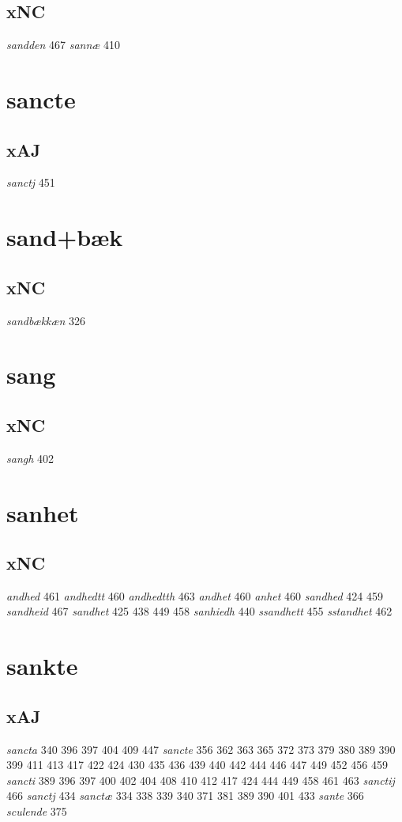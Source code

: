 \documentclass[a4paper,twocolumn]{article}
\begin{document}
\subsection{xNC}
\label{sec:org21b67e3}
\emph{sandden} 467 \emph{sannæ} 410 
\section{sancte}
\label{sec:org790601a}
\subsection{xAJ}
\label{sec:org2f84264}
\emph{sanctj} 451 
\section{sand+bæk}
\label{sec:org9165339}
\subsection{xNC}
\label{sec:orgfcf79a4}
\emph{sandbækkæn} 326 
\section{sang}
\label{sec:org15e0db7}
\subsection{xNC}
\label{sec:org1b73987}
\emph{sangh} 402 
\section{sanhet}
\label{sec:org9b6e014}
\subsection{xNC}
\label{sec:org605058f}
\emph{andhed} 461 \emph{andhedtt} 460 \emph{andhedtth} 463 \emph{andhet} 460 \emph{anhet} 460 \emph{sandhed} 424 459 \emph{sandheid} 467 \emph{sandhet} 425 438 449 458 \emph{sanhiedh} 440 \emph{ssandhett} 455 \emph{sstandhet} 462 
\section{sankte}
\label{sec:org24dffc0}
\subsection{xAJ}
\label{sec:org4a2619e}
\emph{sancta} 340 396 397 404 409 447 \emph{sancte} 356 362 363 365 372 373 379 380 389 390 399 411 413 417 422 424 430 435 436 439 440 442 444 446 447 449 452 456 459 \emph{sancti} 389 396 397 400 402 404 408 410 412 417 424 444 449 458 461 463 \emph{sanctij} 466 \emph{sanctj} 434 \emph{sanctæ} 334 338 339 340 371 381 389 390 401 433 \emph{sante} 366 \emph{sculende} 375 
\end{document}

